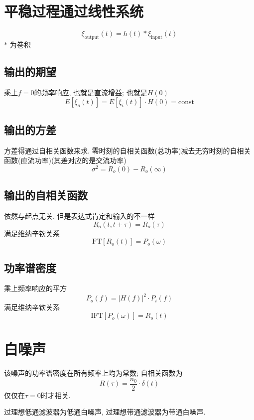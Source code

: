 \documentclass[a4paper]{report}
\begin{document}
\section{平稳过程通过线性系统}
\begin{equation}
  \xi_{\text{output}}(t)=h(t)*\xi_{\text{input}}(t)
\end{equation}
$*$ 为卷积
\subsection{输出的期望}
乘上$f=0$的频率响应, 也就是直流增益; 也就是$H(0)$
\begin{equation}
  E[\xi_o(t)]=E[\xi_i(t)]\cdot H(0)=\text{const}
\end{equation}
\subsection{输出的方差}
方差得通过自相关函数来求. 零时刻的自相关函数(总功率)减去无穷时刻的自相关函数(直流功率)(其差对应的是交流功率)
\begin{equation}
  \sigma^2=R_o(0)-R_o(\infty)
\end{equation}
\subsection{输出的自相关函数}
依然与起点无关, 但是表达式肯定和输入的不一样
$$R_o(t,t+\tau)=R_o(\tau)$$
满足维纳辛钦关系
\begin{equation}
  \text{FT}[R_o(t)]=P_o(\omega)
\end{equation}
\subsection{功率谱密度}
乘上频率响应的平方
\begin{equation}
  P_o(f)=\lvert H(f)\rvert^2\cdot P_i(f)
\end{equation}
满足维纳辛钦关系
\begin{equation}
  \text{IFT}[P_o(\omega)]=R_o(t)
\end{equation}
\section{白噪声}
该噪声的功率谱密度在所有频率上均为常数; 自相关函数为
\begin{equation}
  R(\tau)=\frac{n_0}{2}\cdot \delta(t)
\end{equation}
仅仅在$\tau=0$时才相关. 

过理想低通滤波器为低通白噪声, 过理想带通滤波器为带通白噪声. 
\end{document}
